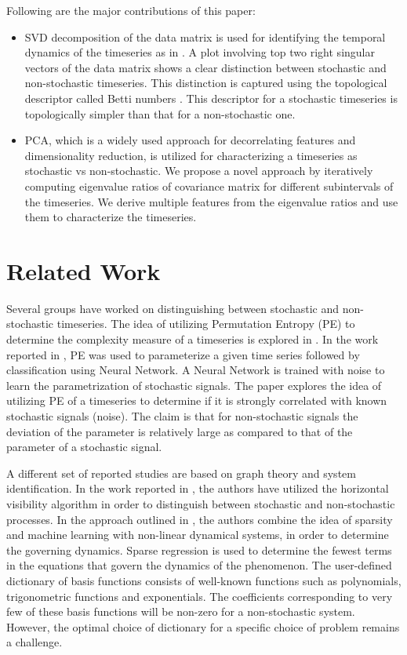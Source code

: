 \documentclass[10pt,conference]{IEEEtran}
\begin{document}
Following are the major contributions of this paper:
\begin{itemize}
  \item SVD decomposition of the data matrix is used for identifying the temporal dynamics of the timeseries as in \cite{misra2006}. A plot involving top two right singular vectors of the data matrix shows a clear distinction between stochastic and non-stochastic timeseries. This distinction is captured using the topological descriptor called Betti numbers \cite{jmlr}. This descriptor for a stochastic timeseries is topologically simpler than that for a non-stochastic one.

  \item PCA, which is a widely used approach for decorrelating features and dimensionality reduction, is utilized for characterizing a timeseries as stochastic vs non-stochastic. We propose a novel approach by iteratively computing eigenvalue ratios  of covariance matrix for different subintervals of the timeseries. We  derive multiple features from the eigenvalue ratios and use them to characterize the timeseries.
\end{itemize}

\section{Related Work}
Several groups have worked on distinguishing between stochastic and non-stochastic timeseries. The idea of utilizing Permutation Entropy (PE) to determine the complexity measure of a timeseries is explored in \cite{Bandt2002}. In the work reported in \cite{Boaretto2021}, PE was used to parameterize a given time series  followed by classification using  Neural Network. A Neural Network is trained with noise to learn the parametrization of stochastic signals. The paper explores the idea of utilizing PE of a timeseries to determine if it is strongly correlated with known stochastic signals (noise).   The claim is that for non-stochastic signals the deviation of the parameter is relatively large as compared to that of the parameter of a stochastic signal.

A different set of reported studies are based on  graph theory and system identification. In the work reported in \cite{lacasa2010}, the authors have utilized the horizontal visibility algorithm in order to distinguish between stochastic and non-stochastic processes. In the approach outlined in \cite{Brunton2016}, the authors combine the idea of sparsity and machine learning with non-linear dynamical systems, in order to determine the governing dynamics. Sparse regression is used to determine the fewest terms in the equations that govern the dynamics of the phenomenon. The user-defined dictionary of basis functions consists of well-known functions such as polynomials, trigonometric functions and exponentials. The coefficients corresponding to very few of these basis functions will be non-zero for a non-stochastic system. However, the optimal choice of dictionary for a specific choice of problem remains a challenge.
\end{document}
